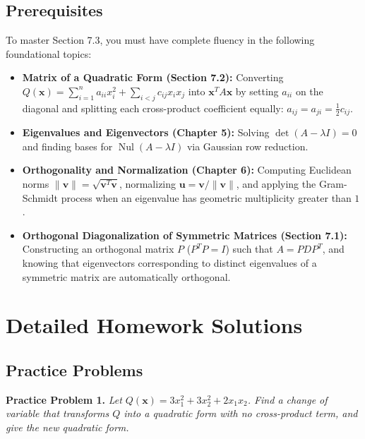 \documentclass[11pt, letterpaper]{article}
\theoremstyle{definition}
\theoremstyle{remark}
\begin{document}
\subsection{Prerequisites}
To master Section 7.3, you must have complete fluency in the following foundational topics:
\begin{itemize}
    \item \textbf{Matrix of a Quadratic Form (Section 7.2):} Converting $Q(\mathbf{x}) = \sum_{i=1}^n a_{ii} x_i^2 + \sum_{i < j} c_{ij} x_i x_j$ into $\mathbf{x}^T A \mathbf{x}$ by setting $a_{ii}$ on the diagonal and splitting each cross-product coefficient equally: $a_{ij} = a_{ji} = \frac{1}{2} c_{ij}$.
    \item \textbf{Eigenvalues and Eigenvectors (Chapter 5):} Solving $\det(A - \lambda I) = 0$ and finding bases for $\operatorname{Nul}(A - \lambda I)$ via Gaussian row reduction.
    \item \textbf{Orthogonality and Normalization (Chapter 6):} Computing Euclidean norms $\|\mathbf{v}\| = \sqrt{\mathbf{v}^T \mathbf{v}}$, normalizing $\mathbf{u} = \mathbf{v}/\|\mathbf{v}\|$, and applying the Gram-Schmidt process when an eigenvalue has geometric multiplicity greater than $1$.
    \item \textbf{Orthogonal Diagonalization of Symmetric Matrices (Section 7.1):} Constructing an orthogonal matrix $P$ ($P^T P = I$) such that $A = P D P^T$, and knowing that eigenvectors corresponding to distinct eigenvalues of a symmetric matrix are automatically orthogonal.
\end{itemize}

\newpage
\section{Detailed Homework Solutions}

\subsection{Practice Problems}

\textbf{Practice Problem 1.} \emph{Let $Q(\mathbf{x}) = 3x_1^2 + 3x_2^2 + 2x_1x_2$. Find a change of variable that transforms $Q$ into a quadratic form with no cross-product term, and give the new quadratic form.}
\end{document}
